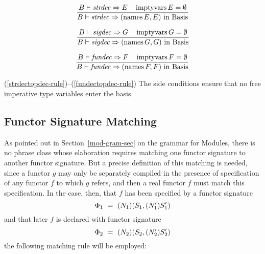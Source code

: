 \begin{equation}	%
\label{strdectopdec-rule}
\frac{\B\ts\strdec\ra\E \quad\imptyvars\E=\emptyset}
     {\B\ts\strdec\ra
      (\NamesFcn\E,\E)\ \In\ \Basis
     }\index{45.3}
\end{equation}

\vspace{6pt}
\begin{equation}	%
\frac{\B\ts\sigdec\ra\G \quad\imptyvars\G=\emptyset}
     {\B\ts\sigdec\ra
      (\NamesFcn\G,\G)\ \In\ \Basis
     }\index{46.0}
\end{equation}

\vspace{6pt}
\begin{equation}	%
\label{fundectopdec-rule}
\frac{\B\ts\fundec\ra\F \quad\imptyvars\F=\emptyset}
     {\B\ts\fundec\ra
      (\NamesFcn\F,\F)\ \In\ \Basis
     }
\end{equation}
\comments
\begin{description}
\item{(\ref{strdectopdec-rule})--(\ref{fundectopdec-rule})} The side
conditions ensure that no free imperative type variables enter the 
basis.
\end{description}

\subsection{Functor Signature Matching}
\label{fun-sig-match-sec}
As pointed out in Section~\ref{mod-gram-sec} on the 
grammar for Modules, there is no phrase class whose elaboration 
requires matching one functor signature to another functor signature.
But a precise definition of this matching is needed, since a 
functor $g$ may only be separately compiled in the presence of 
specification of any functor $f$ to which $g$ refers, and then a 
real functor $f$ must match this specification.
In the case, then, that $f$ has been specified by a functor signature
\[\Phi_1\ =\ (N_{1})(S_{1},(N_{1}')S_{1} ')\]
and that later $f$ is declared with functor signature
\[\Phi_2\ =\ (N_{2})(S_{2},(N_{2}')S_{2} ')\]
the following matching rule will be employed:

